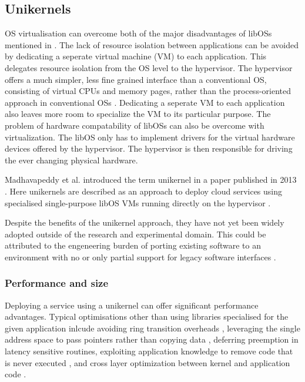 \documentclass[10pt,twocolumn,a4paper]{article}
\begin{document}
  \subsection{Unikernels}
    OS virtualisation can overcome both of the major disadvantages of libOSs
    mentioned in .
    The lack of resource isolation between applications can be avoided by
    dedicating a seperate virtual machine (VM) to each application.
    This delegates resource isolation from the OS level to the hypervisor.
    The hypervisor offers a much simpler, less fine grained interface than
    a conventional OS, consisting of virtual CPUs and memory pages, 
    rather than the process-oriented approach in conventional OSs \cite{madhavapeddy13-2}.
    Dedicating a seperate VM to each application also leaves more room
    to specialize the VM to its particular purpose.
    The problem of hardware compatability of libOSs can also be overcome
    with virtualization. The libOS only has to implement drivers for
    the virtual hardware devices offered by the hypervisor.
    The hypervisor is then responsible for driving the ever changing physical
    hardware.

    Madhavapeddy et al. introduced the term unikernel in a paper 
    published in 2013 \cite{madhavapeddy13}.
    Here unikernels are described as an approach to deploy cloud services
    using specialised single-purpose libOS VMs running directly 
    on the hypervisor \cite{madhavapeddy13}.

    Despite the benefits of the unikernel approach, they have not yet been widely adopted
    outside of the research and experimental domain.
    This could be attributed to the engeneering burden of porting existing software
    to an environment with no or only partial support for legacy software interfaces \cite{raza19}.
    
    \subsubsection{Performance and size}
      Deploying a service using a unikernel can offer significant
      performance advantages.
      Typical optimisations other than using libraries specialised for the given
      application inlcude avoiding ring transition overheads \cite{maeda2003},
      leveraging the single address space to pass pointers rather than copying data \cite {schatzberg16},
      deferring preemption in latency sensitive routines,
      exploiting application knowledge to remove code that is never executed \cite{madhavapeddy13},
      and cross layer optimization between kernel and application code \cite{raza19}.
\end{document}
